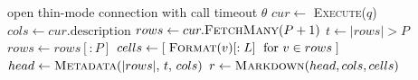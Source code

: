 \begin{algorithm}[t]
\caption{Bounded result pipeline for one row-returning tool call.}
\label{alg:pipeline}
open thin-mode connection with call timeout $\theta$\;
$cur \leftarrow$ \textsc{Execute}($q$)\;
$cols \leftarrow cur.\text{description}$\;
$rows \leftarrow cur.\textsc{FetchMany}(P+1)$ 
$t \leftarrow |rows| > P$\;
$rows \leftarrow rows[:P]$\;
$cells \leftarrow [\; \textsc{Format}(v)[:L] \;\text{ for } v \in rows \;]$\;
$head \leftarrow \textsc{Metadata}(|rows|,\, t,\, cols)$\;
\Return $r \leftarrow \textsc{Markdown}(head, cols, cells)$\;
\end{algorithm}
